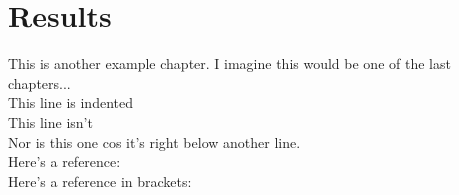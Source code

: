 
\chapter{Results}

This is another example chapter. I imagine this would be one of the last chapters...\\

This line is indented\\

\noindent This line isn't\\
Nor is this one cos it's right below another line.\\

\noindent Here's a reference: \citet{1959HDP....53..275D}\\
Here's a reference in brackets: \citep{2008IAUS..244...53S}\\
